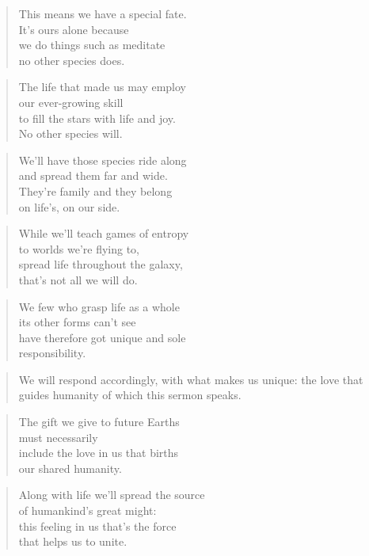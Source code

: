 \documentclass[14pt,a4paper]{article}
\begin{document}
\begin{verse}
This means we have a special fate.\\
It’s ours alone because\\
we do things such as meditate\\
no other species does.
\end{verse}

\begin{verse}
The life that made us may employ\\
our ever-growing skill\\
to fill the stars with life and joy.\\
No other species will.
\end{verse}

\begin{verse}
We’ll have those species ride along\\
and spread them far and wide.\\
They’re family and they belong\\
on life’s, on our side.
\end{verse}

\begin{verse}
While we’ll teach games of entropy\\
to worlds we’re flying to,\\
spread life throughout the galaxy,\\
that’s not all we will do.
\end{verse}

\begin{verse}
We few who grasp life as a whole\\
its other forms can’t see\\
have therefore got unique and sole\\
responsibility.
\end{verse}

\begin{verse}
We will respond accordingly,
with what makes us unique:
the love that guides humanity
of which this sermon speaks.
\end{verse}

\begin{verse}
The gift we give to future Earths\\
must necessarily\\
include the love in us that births\\
our shared humanity.
\end{verse}

\begin{verse}
Along with life we’ll spread the source\\
of humankind’s great might:\\
this feeling in us that’s the force\\
that helps us to unite.
\end{verse}
\end{document}
